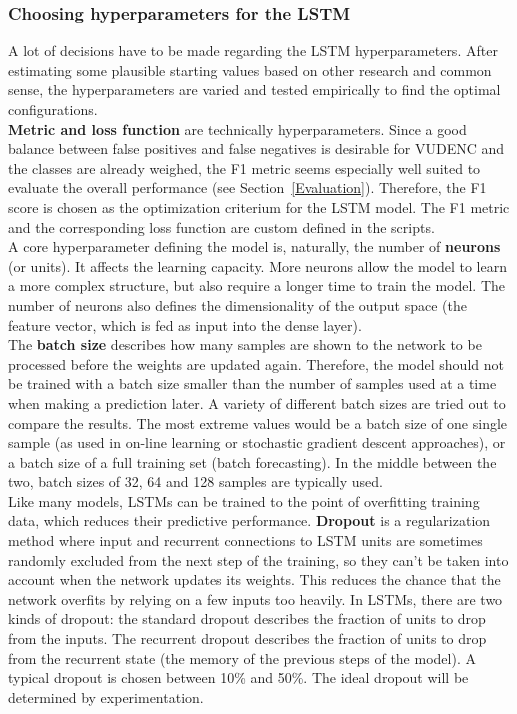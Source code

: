 \documentclass[
a4paper,
pagesize,
pdftex,
12pt,
twoside, %
BCOR=5mm, %
ngerman,
fleqn,
final,
]{scrartcl}
\begin{document}
	\subsubsection{Choosing hyperparameters for the LSTM}
	A lot of decisions have to be made regarding the LSTM hyperparameters. After estimating some plausible starting values based on other research and common sense, the hyperparameters are varied and tested empirically to find the optimal configurations.\\
	\textbf{Metric and loss function} are technically hyperparameters. Since a good balance between false positives and false negatives is desirable for VUDENC and the classes are already weighed, the F1 metric seems especially well suited to evaluate the overall performance (see Section~\ref{Evaluation}). Therefore, the F1 score is chosen as the optimization criterium for the LSTM model. The F1 metric and the corresponding loss function are custom defined in the scripts.\\
	A core hyperparameter defining the model is, naturally, the number of \textbf{neurons} (or units). It affects the learning capacity. More neurons allow the model to learn a more complex structure, but also require a longer time to train the model. The number of neurons also defines the dimensionality of the output space (the feature vector, which is fed as input into the dense layer).\\  
	The \textbf{batch size} describes how many samples are shown to the network to be processed before the weights are updated again. Therefore, the model should not be trained with a batch size smaller than the number of samples used at a time when making a prediction later. A variety of different batch sizes are tried out to compare the results. The most extreme values would be a batch size of one single sample (as used in on-line learning or stochastic gradient descent approaches), or a batch size of a full training set (batch forecasting). In the middle between the two, batch sizes of 32, 64 and 128 samples are typically used.\\
	Like many models, LSTMs can be trained to the point of overfitting training data, which reduces their predictive performance. \textbf{Dropout} is a regularization method where input and recurrent connections to LSTM units are sometimes randomly excluded from the next step of the training, so they can't be taken into account when the network updates its weights. This reduces the chance that the network overfits by relying on a few inputs too heavily. In LSTMs, there are two kinds of dropout: the standard dropout describes the fraction of units to drop from the inputs. The recurrent dropout describes the fraction of units to drop from the recurrent state (the memory of the previous steps of the model). A typical dropout is chosen between 10\% and 50\%. The ideal dropout will be determined by experimentation.\\
\end{document}
